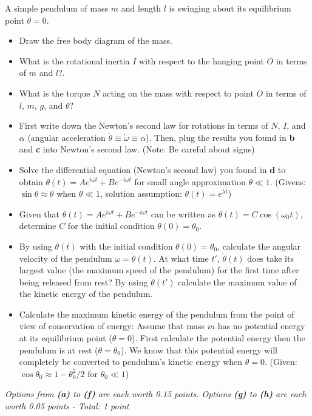 \documentclass[../../main.tex]{subfiles}
\begin{document}
A simple pendulum of mass $m$ and length $l$ is swinging about its equilibrium point $\theta=0$.
\begin{itemize}
    \item[\textbf{(a)}] Draw the free body diagram of the mass.
    \item[\textbf{(b)}] What is the rotational inertia $I$ with respect to the hanging point $O$ in terms of $m$ and $l$?.
    \item[\textbf{(c)}] What is the torque $N$ acting on the mass with respect to point $O$ in terms of $l$, $m$, $g$, and $\theta$?
    \item[\textbf{(d)}] First write down the Newton's second law for rotations in terms of $N$, $I$, and $\alpha$ (angular acceleration $\ddot{\theta}\equiv \dot{\omega}\equiv \alpha$). Then, plug the results you found in \textbf{b} and \textbf{c} into Newton's second law. (Note: Be careful about signs)
    \item[\textbf{(e)}] Solve the differential equation (Newton's second law) you found in \textbf{d} to obtain $\theta(t)=Ae^{i\omega t}+Be^{-i\omega t}$ for small angle approximation $\theta \ll 1$. (Givens: $\sin\theta\approx \theta$ when $\theta\ll 1$, solution assumption: $\theta(t)=e^{\lambda t}$)
    \item[\textbf{(f)}] Given that $\theta(t)=Ae^{i\omega t}+Be^{-i\omega t}$ can be written as $\theta(t)=C\cos(\omega_0t)$, determine $C$ for the initial condition $\theta(0)=\theta_0$.
    \item[\textbf{(g)}] By using $\theta(t)$ with the initial condition $\theta(0)=\theta_0$, calculate the angular velocity of the pendulum $\omega=\dot{\theta}(t)$. At what time $t'$, $\dot{\theta}(t)$ does take its largest value (the maximum speed of the pendulum) for the first time after being released from rest? By using $\dot{\theta}(t')$ calculate the maximum value of the kinetic energy of the pendulum.
    \item[\textbf{(h)}] Calculate the maximum kinetic energy of the pendulum from the point of view of conservation of energy: Assume that mass $m$ has no potential energy at its equilibrium point ($\theta=0$). First calculate the potential energy then the pendulum is at rest ($\theta=\theta_0$). We know that this potential energy will completely be converted to pendulum's kinetic energy when $\theta=0$. (Given: $\cos\theta_0\approx 1-\theta_0^2/2$ for $\theta_0\ll 1$)
    \end{itemize}

\textit{Options from \textbf{(a)} to \textbf{(f)} are each worth 0.15 points. Options \textbf{(g)} to \textbf{(h)} are each worth 0.05 points - Total: 1 point} 
\end{document}
